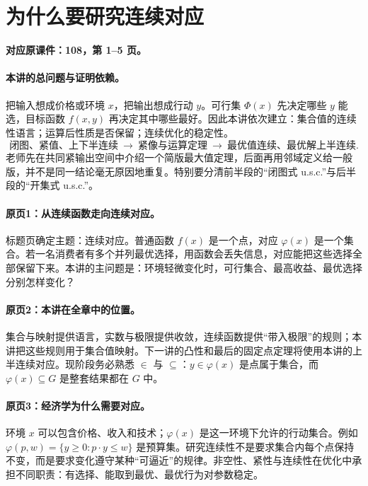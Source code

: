 \clearpage\section{为什么要研究连续对应}\label{g:108:1}

\textbf{对应原课件：108，第 1--5 页。}


\paragraph{本讲的总问题与证明依赖。}
把输入想成价格或环境 $x$，把输出想成行动 $y$。可行集 $\Phi(x)$ 先决定哪些 $y$ 能选，目标函数 $f(x,y)$ 再决定其中哪些最好。因此本讲依次建立：集合值的连续性语言；运算后性质是否保留；连续优化的稳定性。
\[\text{闭图、紧值、上下半连续}\ \longrightarrow\ \text{紧像与运算定理}
\ \longrightarrow\ \text{最优值连续、最优解上半连续}.\]
老师先在共同紧输出空间中介绍一个简版最大值定理，后面再用邻域定义给一般版，并不是同一结论毫无原因地重复。特别要分清前半段的“闭图式 u.s.c.”与后半段的“开集式 u.s.c.”。


\paragraph{原页1：从连续函数走向连续对应。}标题页确定主题：连续对应。普通函数 $f(x)$ 是一个点，对应 $\varphi(x)$ 是一个集合。若一名消费者有多个并列最优选择，用函数会丢失信息，对应能把这些选择全部保留下来。本讲的主问题是：环境轻微变化时，可行集合、最高收益、最优选择分别怎样变化？



\paragraph{原页2：本讲在全章中的位置。}集合与映射提供语言，实数与极限提供收敛，连续函数提供“带入极限”的规则；本讲把这些规则用于集合值映射。下一讲的凸性和最后的固定点定理将使用本讲的上半连续对应。现阶段务必熟悉 $\in$ 与 $\subseteq$：$y\in\varphi(x)$ 是点属于集合，而 $\varphi(x)\subseteq G$ 是整套结果都在 $G$ 中。



\paragraph{原页3：经济学为什么需要对应。}环境 $x$ 可以包含价格、收入和技术；$\varphi(x)$ 是这一环境下允许的行动集合。例如 $\varphi(p,w)=\{y\ge0:p\cdot y\le w\}$ 是预算集。研究连续性不是要求集合内每个点保持不变，而是要求变化遵守某种“可逼近”的规律。非空性、紧性与连续性在优化中承担不同职责：有选择、能取到最优、最优行为对参数稳定。



